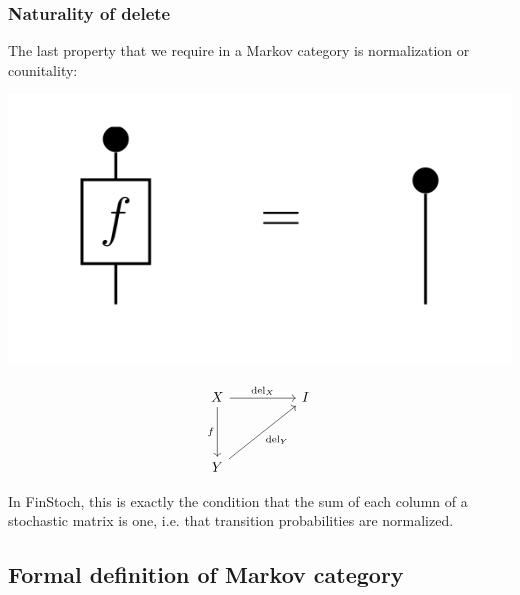 \begin{frame}
    \frametitle{Naturality of delete}
The last property that we require in a Markov category is normalization or counitality:

\begin{minipage}{.48\textwidth}
    \includegraphics[width=\textwidth]{graphics/string/markov_nat_delete.png}
\end{minipage}
\hfill
\begin{minipage}{.48\textwidth}
\[\begin{tikzcd}[ampersand replacement=\&]
	X \&\& I \\
	\\
	Y
	\arrow["{\text{del}_Y}"', from=3-1, to=1-3]
	\arrow["{\text{del}_X}", from=1-1, to=1-3]
	\arrow["f"', from=1-1, to=3-1]
\end{tikzcd}\]
\end{minipage}\pause

In FinStoch, this is exactly the condition that the sum of each column of a stochastic matrix is one, i.e. that transition probabilities are normalized.
\end{frame}

\subsection{Formal definition of Markov category}

